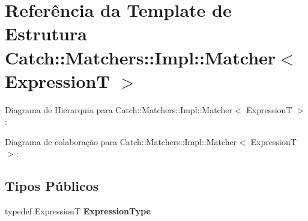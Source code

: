 \hypertarget{structCatch_1_1Matchers_1_1Impl_1_1Matcher}{}\section{Referência da Template de Estrutura Catch\+:\+:Matchers\+:\+:Impl\+:\+:Matcher$<$ ExpressionT $>$}
\label{structCatch_1_1Matchers_1_1Impl_1_1Matcher}


Diagrama de Hierarquia para Catch\+:\+:Matchers\+:\+:Impl\+:\+:Matcher$<$ ExpressionT $>$\+:


Diagrama de colaboração para Catch\+:\+:Matchers\+:\+:Impl\+:\+:Matcher$<$ ExpressionT $>$\+:
\subsection*{Tipos Públicos}
\begin{DoxyCompactItemize}
\item 
typedef ExpressionT {\bfseries Expression\+Type}\hypertarget{structCatch_1_1Matchers_1_1Impl_1_1Matcher_a7f5068cbacd1eed06cf243e63446e7e1}{}\label{structCatch_1_1Matchers_1_1Impl_1_1Matcher_a7f5068cbacd1eed06cf243e63446e7e1}

\end{DoxyCompactItemize}
